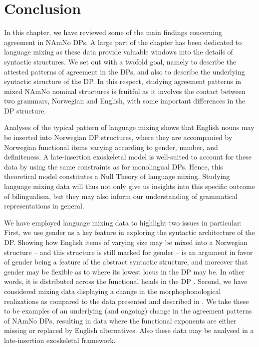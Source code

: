 \documentclass[output=paper]{langscibook}
\begin{document}
\section{Conclusion}\label{sec:riksem:6}

In this chapter, we have reviewed some of the main findings concerning agreement in NAmNo DPs. A large part of the chapter has been dedicated to language mixing as these data provide valuable windows into the details of syntactic structures. We set out with a twofold goal, namely to describe the attested patterns of agreement in the DPs, and also to describe the underlying syntactic structure of the DP. In this respect, studying agreement patterns in mixed NAmNo nominal structures is fruitful as it involves the contact between two grammars, Norwegian and English, with some important differences in the DP structure. 



Analyses of the typical pattern of language mixing shows that English nouns may be inserted into Norwegian DP structures, where they are accompanied by Norwegian functional items varying according to gender, number, and definiteness. A late-insertion exoskeletal model is well-suited to account for these data by using the same constraints as for monolingual DPs. Hence, this theoretical model constitutes a Null Theory of language mixing. Studying language mixing data will thus not only give us insights into this specific outcome of bilingualism, but they may also inform our understanding of grammatical representations in general. 



We have employed language mixing data to highlight two issues in particular: First, we use gender as a key feature in exploring the syntactic architecture of the DP. Showing how English items of varying size may be mixed into a Norwegian structure – and this structure is still marked for gender -- is an argument in favor of gender being a feature of the abstract syntactic structure, and moreover that gender may be flexible as to where its lowest locus in the DP may be. In other words, it is distributed across the functional heads in the DP \citep{ÅfarliEtAl2021}. Second, we have considered mixing data displaying a change in the morphophonological realizations as compared to the data presented and described in \citet{Haugen1953}. We take these to be examples of an underlying (and ongoing) change in the agreement patterns of NAmNo DPs, resulting in data where the functional exponents are either missing or replaced by English alternatives. Also these data may be analysed in a late-insertion exoskeletal framework. 
\end{document}
